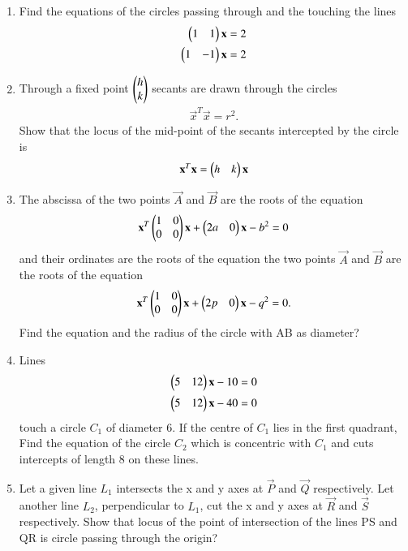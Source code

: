 \begin{enumerate}[label=\arabic*.,ref=\thesubsection.\theenumi]
\item Find the equations of the circles passing through  and the touching the lines 
\begin{align}
\begin{pmatrix}1&1\end{pmatrix}\mathbf{x}=2 \\
\begin{pmatrix}1&-1\end{pmatrix}\mathbf{x}=2
\end{align}
    
\item Through a fixed point $\begin{pmatrix}h\\k\end{pmatrix}$ secants are drawn through the circles 
\begin{align}
\vec{x}^T\vec{x}=r^2.
\end{align} 
Show that the locus of the mid-point of the secants intercepted by the circle is 
\begin{align}
\mathbf{x}^T\mathbf{x}=\begin{pmatrix}h&k\end{pmatrix}\mathbf{x}
\end{align}
    
\item The abscissa of the two points $\vec{A}$ and $\vec{B}$ are the roots of the equation 
\begin{align} 
\mathbf{x}^T \begin{pmatrix} 1 & 0 \\ 0 & 0\end{pmatrix} \mathbf{x}+\begin{pmatrix}2a&0\end{pmatrix}\mathbf {x}-b^2=0
\end{align}
and their ordinates are the roots of the equation the two points $\vec{A}$ and $\vec{B}$ are the roots of the equation 
\begin{align}
\mathbf{x}^T \begin{pmatrix} 1 & 0 \\ 0 & 0\end{pmatrix} \mathbf{x}+\begin{pmatrix}2p&0\end{pmatrix}\mathbf {x}-q^2=0.
\end{align} 
Find the equation and the radius of the circle with AB as diameter?

\item Lines 
\begin{align}
\begin{pmatrix}5&12\end{pmatrix}\mathbf{x}-10=0 \\
\begin{pmatrix}5&12\end{pmatrix}\mathbf{x}-40=0
\end{align} 
touch a circle $C_1$ of diameter 6. If the centre of $C_1$ lies in the first quadrant, Find the equation of the circle $C_2$ which is concentric with $C_1$ and cuts intercepts of length 8 on these lines.

\item Let a given line $L_1$ intersects the x and y axes at $\vec{P}$ and $\vec{Q}$ respectively. Let another line $L_2$, perpendicular to $L_1$, cut the x and y axes at $\vec{R}$ and $\vec{S}$ respectively. Show that locus of the point of intersection of the lines PS and QR is circle passing through the origin?
    

\end{enumerate}
